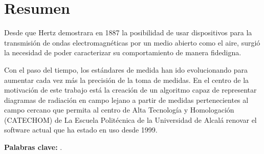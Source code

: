 
\chapter*{Resumen}
\label{cha:resumen}


Desde que Hertz demostrara en 1887 la posibilidad de usar dispositivos para la transmisión de ondas electromagnéticas por un medio abierto como el aire, surgió la necesidad de poder caracterizar su comportamiento de manera fidedigna.

Con el paso del tiempo, los estándares de medida han ido evolucionando para aumentar cada vez más la precisión de la toma de medidas.  En el centro de la motivación de este trabajo está la creación de un algoritmo capaz de representar diagramas de radiación en campo lejano a partir de medidas pertenecientes al campo cercano que permita al centro de Alta Tecnología y Homologación (CATECHOM) de La Escuela Politécnica de la Universidad de Alcalá renovar el software actual que ha estado en uso desde 1999.

\textbf{Palabras clave:} \myThesisKeywords.
